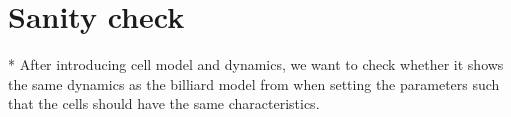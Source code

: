 \section{Sanity check}

* After introducing cell model and dynamics, we want to check whether it shows the same dynamics as the billiard model from \cite{Bruna2012} when setting the parameters such that the cells should have the same characteristics. 